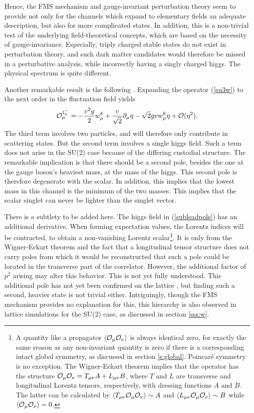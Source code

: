 \documentclass[final,twoside,12pt]{article}
\newcommand*{\no}{\noindent}
\newcommand*{\be}{\begin{equation}}
\newcommand*{\ee}{\end{equation}}
\newcommand*{\pd}{\partial}
\newcommand*{\pdm}{\pd_{\mu}}
\newcommand*{\pref}[1]{(\ref{#1})}
\newcommand*{\mn}{{\mu\nu}}
\newcommand*{\1}{1\!\!\!\bot}
\newcommand*{\la}{\left\langle}
\newcommand*{\ra}{\right\rangle}
\newcommand*{\op}{{\cal O}}
\begin{document}
Hence, the FMS mechanism and gauge-invariant perturbation theory seem to provide not only for the channels which expand to elementary fields an adequate description, but also for more complicated states. In addition, this is a non-trivial test of the underlying field-theoretical concepts, which are based on the necessity of gauge-invariance. Especially, triply charged stable states do not exist in perturbation theory, and such dark matter candidates would therefore be missed in a perturbative analysis, while incorrectly having a singly charged higgs. The physical spectrum is quite different.

Another remarkable result is the following \cite{Maas:2017xzh}. Expanding the operator \pref{su3w} to the next order in the fluctuation field yields
\be
\op_\mu^{1^{-}_0}=-\frac{v^{2}g}{2}w_\mu^8+\frac{v}{\sqrt{2}}\pdm\eta-\sqrt{2}gv w_{\mu}^8\eta+\mathcal{O}(\eta^{2}).\label{subleadpole}
\ee
\no The third term involves two particles, and will therefore only contribute in scattering states. But the second term involves a single higgs field. Such a term does not arise in the SU(2) case because of the differing custodial structure. The remarkable implication is that there should be a second pole, besides the one at the gauge boson's heaviest mass, at the mass of the higgs. This second pole is therefore degenerate with the scalar. In addition, this implies that the lowest mass in this channel is the minimum of the two masses. This implies that the scalar singlet can never be lighter than the singlet vector.

There is a subtlety to be added here. The higgs field in \pref{subleadpole} has an additional derivative. When forming expectation values, the Lorentz indices will be contracted, to obtain a non-vanishing Lorentz scalar\footnote{A quantity like a propagator $\la\op_\mu\op_\nu\ra$ is always identical zero, for exactly the same reason as any non-invariant quantity is zero if there is a corresponding intact global symmetry, as discussed in section \ref{s:global}. Poincar\'e symmetry is no exception. The Wigner-Eckart theorem implies that the operator has the structure $\op_\mu\op_\nu=T_\mn A+L_\mn B$, where $T$ and $L$ are transverse and longitudinal Lorentz tensors, respectively, with dressing functions $A$ and $B$. The latter can be calculated by $\la T_\mn\op_\mu\op_\nu\ra\sim A$ and $\la L_\mn\op_\mu\op_\nu\ra\sim B$ while $\la\op_\mu\op_\nu\ra=0$.}. It is only from the Wigner-Eckart theorem and the fact that a longitudinal tensor structure does not carry poles from which it would be reconstructed that such a pole could be located in the transverse part of the correlator. However, the additional factor of $p^2$ arising may alter this behavior. This is not yet fully understood. This additional pole has not yet been confirmed on the lattice \cite{Maas:unpublishedtoerek}, but finding such a second, heavier state is not trivial either. Intriguingly, though the FMS mechanism provides no explanation for this, this hierarchy is also observed in lattice simulations for the SU(2) case, as discussed in section \ref{sss:w}.
\end{document}
